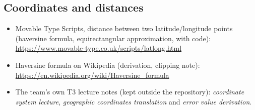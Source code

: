 \documentclass{article}
\begin{document}
{\subsection*{Coordinates and distances}
\begin{itemize}
\item Movable Type Scripts, distance between two latitude/longitude points
      (haversine formula, equirectangular approximation, with code):\\
      \url{https://www.movable-type.co.uk/scripts/latlong.html}
\item Haversine formula on Wikipedia (derivation, clipping note):\\
      \url{https://en.wikipedia.org/wiki/Haversine_formula}
\item The team's own T3 lecture notes (kept outside the repository):
      \emph{coordinate system lecture}, \emph{geographic coordinates
      translation} and \emph{error value derivation}.
\end{itemize}

}
\end{document}
